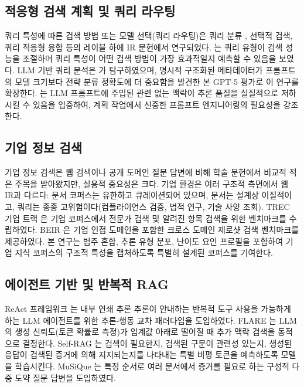 \documentclass[11pt, a4paper]{article}
\begin{document}
\subsection{적응형 검색 계획 및 쿼리 라우팅}

쿼리 특성에 따른 검색 방법 또는 모델 선택(쿼리 라우팅)은 쿼리 분류 \citep{salton1975smart}, 선택적 검색, 쿼리 적응형 융합 등의 레이블 하에 IR 문헌에서 연구되었다. \citet{nogueira2019passage}는 쿼리 유형이 검색 성능을 조절하며 쿼리 특성이 어떤 검색 방법이 가장 효과적일지 예측할 수 있음을 보였다. LLM 기반 쿼리 분석은 \citet{ma2023query}가 탐구하였으며, 명시적 구조화된 메타데이터가 프롬프트의 모델 크기보다 전략 분류 정확도에 더 중요함을 발견한 본 GPT-5 평가로 이 연구를 확장한다. \citet{shi2023large}는 LLM 프롬프트에 주입된 관련 없는 맥락이 추론 품질을 실질적으로 저하시킬 수 있음을 입증하여, 계획 작업에서 신중한 프롬프트 엔지니어링의 필요성을 강조한다.

\subsection{기업 정보 검색}

기업 정보 검색은 웹 검색이나 공개 도메인 질문 답변에 비해 학술 문헌에서 비교적 적은 주목을 받아왔지만, 실용적 중요성은 크다. 기업 환경은 여러 구조적 측면에서 웹 IR과 다르다: 문서 코퍼스는 유한하고 큐레이션되어 있으며, 문서는 설계상 이질적이고, 쿼리는 종종 고위험이다(컴플라이언스 검증, 법적 연구, 기술 사양 조회). TREC 기업 트랙 \citep{voorhees2005trec}은 기업 코퍼스에서 전문가 검색 및 알려진 항목 검색을 위한 벤치마크를 수립하였다. BEIR \citep{thakur2021beir}은 기업 인접 도메인을 포함한 크로스 도메인 제로샷 검색 벤치마크를 제공하였다. 본 연구는 범주 혼합, 추론 유형 분포, 난이도 요인 프로필을 포함하여 기업 지식 코퍼스의 구조적 특성을 캡처하도록 특별히 설계된 코퍼스를 기여한다.

\subsection{에이전트 기반 및 반복적 RAG}

ReAct 프레임워크 \citep{yao2023react}는 내부 연쇄 추론 추론이 안내하는 반복적 도구 사용을 가능하게 하는 LLM 에이전트를 위한 추론-행동 교차 패러다임을 도입하였다. FLARE \citep{ji2023flare}는 LLM의 생성 신뢰도(토큰 확률로 측정)가 임계값 아래로 떨어질 때 추가 맥락 검색을 동적으로 결정한다. Self-RAG \citep{asai2024selfrag}는 검색이 필요한지, 검색된 구문이 관련성 있는지, 생성된 응답이 검색된 증거에 의해 지지되는지를 나타내는 특별 비평 토큰을 예측하도록 모델을 학습시킨다. MuSiQue \citep{trivedi2022musique}는 특정 순서로 여러 문서에서 증거를 필요로 하는 구성적 다중 도약 질문 답변을 도입하였다.
\end{document}
